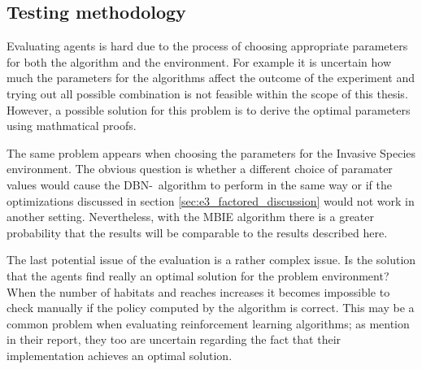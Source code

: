 \subsection{Testing methodology}

Evaluating agents is hard due to the process of choosing appropriate parameters
for both the algorithm and the environment. For example it is uncertain how
much the parameters for the algorithms affect the outcome of the experiment and
trying out all possible combination is not feasible within the scope of this
thesis. However, a possible solution for this problem is to derive the optimal
parameters using mathmatical proofs.

The same problem appears when choosing the parameters for the Invasive Species
environment. The obvious question is whether a different choice of paramater values 
would cause the DBN-\etre\ algorithm to perform in the same way or if the optimizations
discussed in section \ref{sec:e3_factored_discussion} would not work in
another setting. Nevertheless, with the MBIE algorithm there is a greater
probability that the results will be comparable to the results described here.

The last potential issue of the evaluation is a rather complex issue. Is the solution that the agents find really an optimal solution for the problem environment? When the number of habitats and reaches increases it becomes impossible to check manually if the policy computed by the algorithm is correct. This may be a common problem when evaluating reinforcement learning algorithms; as \textcite{dietterich2013pac} mention in their report, they too are uncertain regarding the fact that their implementation achieves an optimal solution. 

